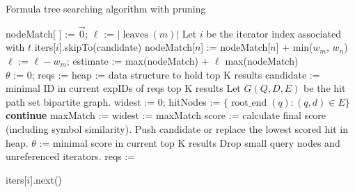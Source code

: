 \documentclass[runningheads]{llncs}
\begin{document}
\begin{algorithm}[!b]
\scriptsize
\caption{Formula tree searching algorithm with pruning}
\label{alg1}
\begin{algorithmic}[1]
	\State nodeMatch[ ] := $\vec{0}$; $\ell$ := $|\operatorname{leaves}(m)|$
 	    \State Let $i$ be the iterator index associated with $t$
			\State iters[$i$].skipTo(candidate)
		\EndIf
 			\State nodeMatch[$n$] := nodeMatch[$n$] + min($w_m$, $w_n$)
 		\EndFor
		\EndIf
		\State $\ell$ := $\ell - w_m$;
		\State estimate := max(nodeMatch) + $\ell$ 
			\State {}
		\EndIf
 	\EndFor
 	\State \Return max(nodeMatch)
\EndFunction
~\\
	\State $\theta$ := $0$; reqs := 
	\State heap := data structure to hold top K results
		\State candidate := minimal ID in current expIDs of reqs
			\State \Return top K results
		\EndIf
		\State Let $G(Q, D, E)$ be the hit path set bipartite graph.
		\State widest := 0; hitNodes := $\{\operatorname{root\_end}(q): (q, d) \in E \}$
				\State \textbf{continue}
			\EndIf
			\State maxMatch := 
			 widest := maxMatch  \EndIf
		\EndFor
		    \State score := calculate final score (including symbol similarity).
				\State Push candidate or replace the lowest scored hit in heap.
					\State $\theta$ := minimal score in current top K results
					\State Drop small query nodes and unreferenced iterators.
					\State reqs := 
				\EndIf
			\EndIf
		\EndIf

				iters[$i$].next()
			\EndIf
		\EndFor
	\EndWhile
\EndFunction
\end{algorithmic}
\end{algorithm}
\end{document}

